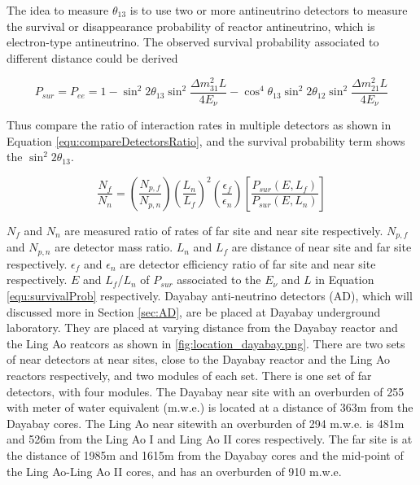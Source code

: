 The idea to measure $\theta_{13}$ is to use two or more antineutrino detectors
to measure the survival or disappearance probability of reactor antineutrino, which is electron-type antineutrino.
The observed survival probability associated to different distance could be derived 


\begin{equation}
\label{equ:survivalProb}
P_{sur} = P_{ee} = 1 - \sin^{2}{2\theta_{13}}\sin^{2}{\frac{{\Delta}m^{2}_{31}L}{4E_{\nu}}} - \cos^{4}{\theta_{13}}\sin^{2}{2\theta_{12}}\sin^{2}{\frac{{\Delta}m^{2}_{21}L}{4E_{\nu}}}
\end{equation}


Thus compare the ratio of interaction rates in multiple detectors as shown in Equation \ref{equ:compareDetectorsRatio}, and
the survival probability term shows the $\sin^{2}{2\theta_{13}}$.


\begin{equation}
\label{equ:compareDetectorsRatio}
\frac{N_{f}}{N_{n}} = (\frac{N_{p,f}}{N_{p,n}})(\frac{L_n}{L_f})^{2}(\frac{\epsilon_f}{\epsilon_n})[\frac{P_{sur}(E,L_f)}{P_{sur}(E,L_n)}]
\end{equation}

$N_{f}$ and $N_{n}$ are measured ratio of rates of far site and near site respectively.
$N_{p,f}$ and $N_{p,n}$ are detector mass ratio.
${L_n}$ and ${L_f}$ are distance of near site and far site respectively.
${\epsilon_f}$ and ${\epsilon_n}$ are detector efficiency ratio of far site and near site respectively.
$E$ and $L_f$/$L_n$ of $P_{sur}$ associated to the $E_{\nu}$ and $L$ in Equation \ref{equ:survivalProb} respectively.
Dayabay anti-neutrino detectors (AD), which will discussed more in Section \ref{sec:AD},
are be placed at Dayabay underground laboratory. They are placed at varying distance from the Dayabay reactor and
the Ling Ao reatcors as shown in \ref{fig:location_dayabay.png}. There are two sets of near detectors
at near sites, close to the Dayabay reactor and the Ling Ao reactors respectively, and two modules of each set.
There is one set of far detectors, with four modules. The Dayabay near site with an overburden of
255 with meter of water equivalent (m.w.e.) is located at a distance of 363m from the Dayabay cores. The Ling Ao near sitewith an overburden of
294 m.w.e. is 481m and 526m from the Ling Ao I and Ling Ao II cores respectively. The far site is at the distance
of 1985m and 1615m from the Dayabay cores and the mid-point of the Ling Ao-Ling Ao II cores, and has an overburden
of 910 m.w.e.


